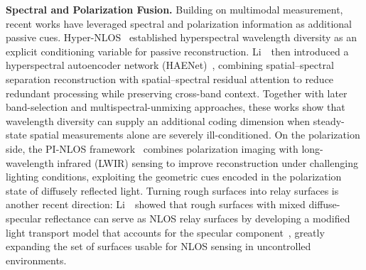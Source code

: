 \vspace{0.8mm}
\noindent \textbf{Spectral and Polarization Fusion.}
Building on multimodal measurement, recent works have leveraged spectral and polarization information as additional passive cues. Hyper-NLOS~\cite{chenHyperNLOS2024} established hyperspectral wavelength diversity as an explicit conditioning variable for passive reconstruction. Li~\etal~then introduced a hyperspectral autoencoder network (HAENet)~\cite{liHyperspectralAutoencoderNLOS2025}, combining spatial--spectral separation reconstruction with spatial--spectral residual attention to reduce redundant processing while preserving cross-band context. Together with later band-selection and multispectral-unmixing approaches, these works show that wavelength diversity can supply an additional coding dimension when steady-state spatial measurements alone are severely ill-conditioned. On the polarization side, the PI-NLOS framework~\cite{liuPolarizedInfraredNLOS2023} combines polarization imaging with long-wavelength infrared (LWIR) sensing to improve reconstruction under challenging lighting conditions, exploiting the geometric cues encoded in the polarization state of diffusely reflected light. Turning rough surfaces into relay surfaces is another recent direction: Li~\etal~showed that rough surfaces with mixed diffuse-specular reflectance can serve as NLOS relay surfaces by developing a modified light transport model that accounts for the specular component~\cite{liRoughSurfaces2025}, greatly expanding the set of surfaces usable for NLOS sensing in uncontrolled environments.
